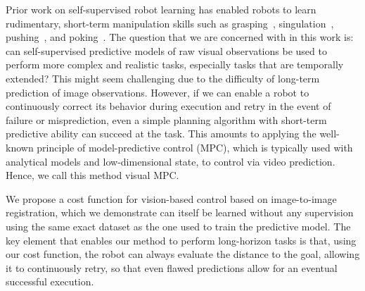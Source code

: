 Prior work on self-supervised robot learning has enabled robots to learn rudimentary, short-term manipulation skills such as grasping~\cite{lerrel,google_handeye}, singulation~\cite{princeton_pushgrasp}, pushing~\cite{foresight,sna}, and poking~\cite{pulkit}. The question that we are concerned with in this work is: can self-supervised predictive models of raw visual observations be used to perform more complex and realistic tasks, especially tasks that are temporally extended? 
This might seem challenging due to the difficulty of long-term prediction of image observations. However, if we can enable a robot to continuously correct its behavior during execution and retry in the event of failure or misprediction, even a simple planning algorithm with short-term predictive ability can succeed at the task. This amounts to applying the well-known principle of model-predictive control (MPC), which is typically used with analytical models and low-dimensional state, to control via video prediction. Hence, we call this method visual MPC.

We propose a cost function for vision-based control based on image-to-image registration, which we demonstrate can itself be learned without any supervision using the same exact dataset as the one used to train the predictive model. The key element that enables our method to perform long-horizon tasks is that, using our cost function, the robot can always evaluate the distance to the goal, allowing it to continuously retry, so that even flawed predictions allow for an eventual successful execution.



